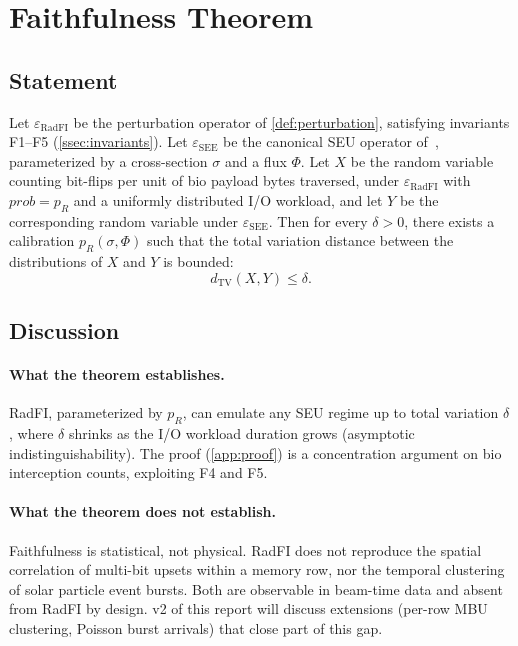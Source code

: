 \section{Faithfulness Theorem}\label{sec:faithfulness}

\renewcommand{\thedefinition}{IV.\arabic{definition}}
\setcounter{definition}{0}

\subsection{Statement}

\begin{theorem}\label{thm:faithfulness}
Let \(\varepsilon_{\text{RadFI}}\) be the perturbation operator of
\cref{def:perturbation}, satisfying invariants F1--F5
(\cref{ssec:invariants}). Let \(\varepsilon_{\text{SEE}}\) be the
canonical SEU operator of~\cite{desbrieres2026beamfsv1}, parameterized
by a cross-section \(\sigma\) and a flux \(\Phi\). Let \(X\) be the
random variable counting bit-flips per unit of bio payload bytes
traversed, under \(\varepsilon_{\text{RadFI}}\) with
\(\mathit{prob} = p_R\) and a uniformly distributed I/O workload, and
let \(Y\) be the corresponding random variable under
\(\varepsilon_{\text{SEE}}\). Then for every \(\delta > 0\), there
exists a calibration \(p_R(\sigma, \Phi)\) such that the total
variation distance between the distributions of \(X\) and \(Y\) is
bounded:
\[
  d_{\text{TV}}(X, Y) \leq \delta.
\]
\end{theorem}

\subsection{Discussion}

\paragraph{What the theorem establishes.}
RadFI, parameterized by \(p_R\), can emulate any SEU regime up to
total variation \(\delta\), where \(\delta\) shrinks as the I/O
workload duration grows (asymptotic indistinguishability). The proof
(\cref{app:proof}) is a concentration argument on bio interception
counts, exploiting F4 and F5.

\paragraph{What the theorem does not establish.}
Faithfulness is statistical, not physical. RadFI does not reproduce
the spatial correlation of multi-bit upsets within a memory row, nor
the temporal clustering of solar particle event bursts. Both are
observable in beam-time data and absent from RadFI by design. v2 of
this report will discuss extensions (per-row MBU clustering, Poisson
burst arrivals) that close part of this gap.

